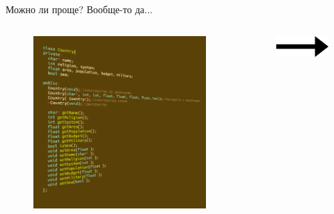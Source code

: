 \documentclass[sans]{beamer}
\begin{document}
\begin{frame}{Можно ли проще?}
	Вообще-то да...
	\newline

	\begin{columns}
		\begin{column}{.4\textwidth}
			\begin{figure}
				\includegraphics[width = \linewidth]{images/country.png}
			\end{figure}
		\end{column}

		\begin{column}{.1\textwidth}
			\begin{figure}
				\includegraphics[width = \linewidth]{images/arrow.png}
			\end{figure}
		\end{column}


\end{columns}
\end{frame}
\end{document}
